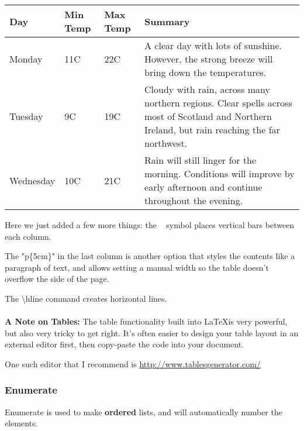 \documentclass[11pt,letterpaper]{article}
\begin{document}
                \begin{center}
                \begin{tabular}{| l | l | l | p{5cm} |}
                \hline
                Day & Min Temp & Max Temp & Summary \\ \hline
                Monday & 11C & 22C & A clear day with lots of sunshine.
                However, the strong breeze will bring down the temperatures. \\ \hline
                Tuesday & 9C & 19C & Cloudy with rain, across many northern regions. Clear spells 
                across most of Scotland and Northern Ireland, 
                but rain reaching the far northwest. \\ \hline
                Wednesday & 10C & 21C & Rain will still linger for the morning. 
                Conditions will improve by early afternoon and continue 
                throughout the evening. \\
                \hline
                \end{tabular}
                \end{center}
            
            Here we just added a few more things: the \textbar~ symbol places vertical bars between each column.
            
            The "p\{5cm\}" in the last column is another option that styles the contents like a paragraph of text, and allows setting a manual width so the table doesn't overflow the side of the page.
            
            The \textbackslash hline command creates horizontal lines. \\\\
            
            \textbf{A Note on Tables:} The table functionality built into \LaTeX is very powerful, but also very tricky to get right. It's often easier to design your table layout in an external editor first, then copy-paste the code into your document.
            
            One such editor that I recommend is \url{http://www.tablesgenerator.com/}
    
        \subsubsection{Enumerate}
            Enumerate is used to make \textbf{ordered} lists, and will automatically number the elements.
            
\end{document}
